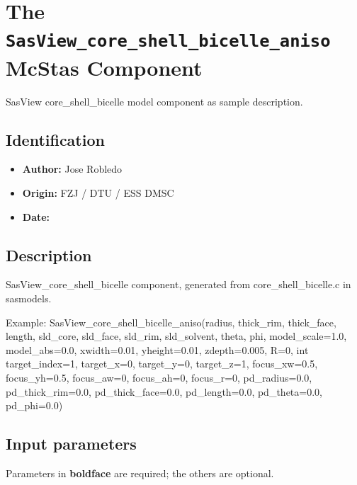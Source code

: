 \section{The \texttt{SasView\_core\_shell\_bicelle\_aniso} McStas Component}
SasView core\_shell\_bicelle model component as sample description.

\subsection*{Identification}
\begin{itemize}
  \item \textbf{Author:} Jose Robledo
  \item \textbf{Origin:} FZJ / DTU / ESS DMSC
  \item \textbf{Date:} 
\end{itemize}

\subsection*{Description}
SasView\_core\_shell\_bicelle component, generated from core\_shell\_bicelle.c in sasmodels.

Example: SasView\_core\_shell\_bicelle\_aniso(radius, thick\_rim, thick\_face, length, sld\_core, sld\_face, sld\_rim, sld\_solvent, theta, phi, model\_scale=1.0, model\_abs=0.0, xwidth=0.01, yheight=0.01, zdepth=0.005, R=0, int target\_index=1, target\_x=0, target\_y=0, target\_z=1, focus\_xw=0.5, focus\_yh=0.5, focus\_aw=0, focus\_ah=0, focus\_r=0, pd\_radius=0.0, pd\_thick\_rim=0.0, pd\_thick\_face=0.0, pd\_length=0.0, pd\_theta=0.0, pd\_phi=0.0)

\subsection*{Input parameters}
Parameters in \textbf{boldface} are required; the others are optional.

